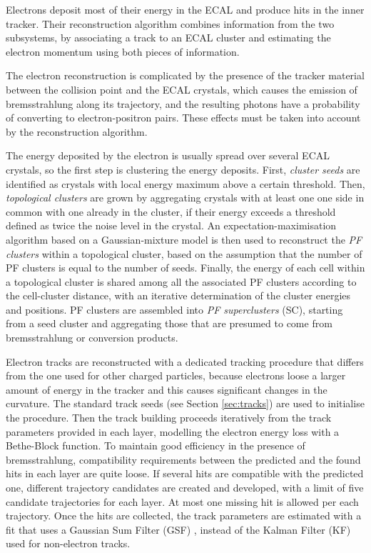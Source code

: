 Electrons deposit most of their energy in the ECAL and produce hits in the inner tracker.
Their reconstruction algorithm combines information from the two subsystems,
by associating a track to an ECAL cluster and estimating the electron momentum using both pieces of information.

The electron reconstruction is complicated by the presence of the tracker material between the collision point and the ECAL crystals,
which causes the emission of bremsstrahlung along its trajectory, and the resulting photons have a probability of converting to electron-positron pairs.
These effects must be taken into account by the reconstruction algorithm.

The energy deposited by the electron is usually spread over several ECAL crystals, so the first step is clustering the energy deposits.
First, \textit{cluster seeds} are identified as crystals with local energy maximum above a certain threshold.
Then, \textit{topological clusters} are grown by aggregating crystals with at least one one side in common with one already in the cluster,
if their energy exceeds a threshold defined as twice the noise level in the crystal.
An expectation-maximisation algorithm based on a Gaussian-mixture model is then used to reconstruct the \textit{PF clusters} within a topological cluster,
based on the assumption that the number of PF clusters is equal to the number of seeds.
Finally, the energy of each cell within a topological cluster is shared among all the associated PF clusters according to the cell-cluster distance,
with an iterative determination of the cluster energies and positions.
PF clusters are assembled into \textit{PF superclusters} (SC), starting from a seed cluster and aggregating those that are presumed to come from bremsstrahlung or conversion products.

Electron tracks are reconstructed with a dedicated tracking procedure that differs from the one used for other charged particles,
because electrons loose a larger amount of energy in the tracker and this causes significant changes in the curvature.
The standard track seeds (see Section \ref{sec:tracks}) are used to initialise the procedure.
Then the track building proceeds iteratively from the track parameters provided in each layer, modelling the electron energy loss with a Bethe-Block function.
To maintain good efficiency in the presence of bremsstrahlung, compatibility requirements between the predicted and the found hits in each layer are quite loose.
If several hits are compatible with the predicted one, different trajectory candidates are created and developed,
with a limit of five candidate trajectories for each layer.
At most one missing hit is allowed per each trajectory.
Once the hits are collected, the track parameters are estimated with a fit that uses a Gaussian Sum Filter (GSF) \cite{CMS-NOTE-2005-001},
instead of the Kalman Filter (KF) \cite{billoir.qian:simultaneous} used for non-electron tracks.

